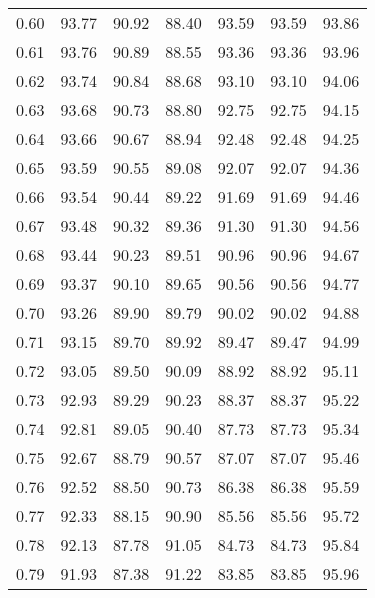\begin{tabular}{|c|c|c|c|c|c|c|}
      0.60 &     93.77 &     90.92 &      88.40 &   93.59 &      93.59 &         93.86 \\
      0.61 &     93.76 &     90.89 &      88.55 &   93.36 &      93.36 &         93.96 \\
      0.62 &     93.74 &     90.84 &      88.68 &   93.10 &      93.10 &         94.06 \\
      0.63 &     93.68 &     90.73 &      88.80 &   92.75 &      92.75 &         94.15 \\
      0.64 &     93.66 &     90.67 &      88.94 &   92.48 &      92.48 &         94.25 \\
      0.65 &     93.59 &     90.55 &      89.08 &   92.07 &      92.07 &         94.36 \\
      0.66 &     93.54 &     90.44 &      89.22 &   91.69 &      91.69 &         94.46 \\
      0.67 &     93.48 &     90.32 &      89.36 &   91.30 &      91.30 &         94.56 \\
      0.68 &     93.44 &     90.23 &      89.51 &   90.96 &      90.96 &         94.67 \\
      0.69 &     93.37 &     90.10 &      89.65 &   90.56 &      90.56 &         94.77 \\
      0.70 &     93.26 &     89.90 &      89.79 &   90.02 &      90.02 &         94.88 \\
      0.71 &     93.15 &     89.70 &      89.92 &   89.47 &      89.47 &         94.99 \\
      0.72 &     93.05 &     89.50 &      90.09 &   88.92 &      88.92 &         95.11 \\
      0.73 &     92.93 &     89.29 &      90.23 &   88.37 &      88.37 &         95.22 \\
      0.74 &     92.81 &     89.05 &      90.40 &   87.73 &      87.73 &         95.34 \\
      0.75 &     92.67 &     88.79 &      90.57 &   87.07 &      87.07 &         95.46 \\
      0.76 &     92.52 &     88.50 &      90.73 &   86.38 &      86.38 &         95.59 \\
      0.77 &     92.33 &     88.15 &      90.90 &   85.56 &      85.56 &         95.72 \\
      0.78 &     92.13 &     87.78 &      91.05 &   84.73 &      84.73 &         95.84 \\
      0.79 &     91.93 &     87.38 &      91.22 &   83.85 &      83.85 &         95.96 \\

\end{tabular}
